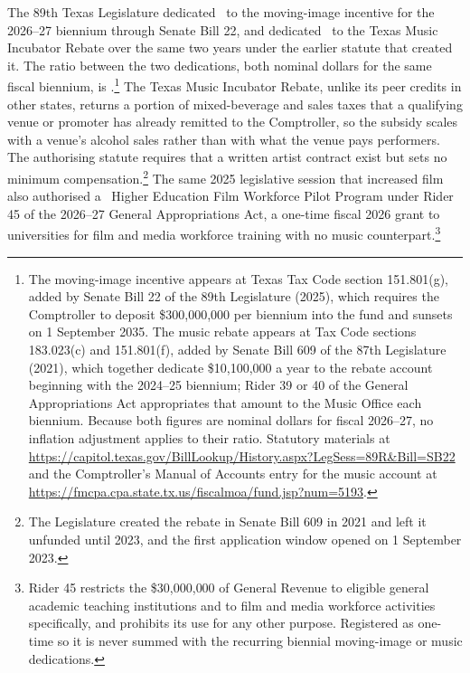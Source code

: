 The 89th Texas Legislature dedicated \NTxFilmIncentiveBiennium\ to the
moving-image incentive for the 2026--27 biennium through Senate Bill 22, and
dedicated \NTxMusicTmirBiennium\ to the Texas Music Incubator Rebate over the
same two years under the earlier statute that created it. The ratio between the
two dedications, both nominal dollars for the same fiscal biennium, is
\NTxFilmMusicRatio.\footnote{The moving-image incentive appears at Texas Tax
Code section 151.801(g), added by Senate Bill 22 of the 89th Legislature
(2025), which requires the Comptroller to deposit \$300{,}000{,}000 per
biennium into the fund and sunsets on 1 September 2035. The music rebate
appears at Tax Code sections 183.023(c) and 151.801(f), added by Senate Bill
609 of the 87th Legislature (2021), which together dedicate
\$10{,}100{,}000 a year to the rebate account beginning with the 2024--25
biennium; Rider 39 or 40 of the General Appropriations Act appropriates that
amount to the Music Office each biennium. Because both figures are nominal
dollars for fiscal 2026--27, no inflation adjustment applies to their ratio.
Statutory materials at
\url{https://capitol.texas.gov/BillLookup/History.aspx?LegSess=89R\&Bill=SB22}
and the Comptroller's Manual of Accounts entry for the music account at
\url{https://fmcpa.cpa.state.tx.us/fiscalmoa/fund.jsp?num=5193}.}
The Texas Music Incubator Rebate, unlike its peer credits in other states,
returns a portion of mixed-beverage and sales taxes that a qualifying venue or
promoter has already remitted to the Comptroller, so the subsidy scales with a
venue's alcohol sales rather than with what the venue pays performers. The
authorising statute requires that a written artist contract exist but sets no
minimum compensation.\footnote{The Legislature created the rebate in Senate
Bill 609 in 2021 and left it unfunded until 2023, and the first application
window opened on 1 September 2023.} The same 2025 legislative session that
increased film also authorised a \NTxFilmWorkforcePilotOnetime\ Higher
Education Film Workforce Pilot Program under Rider 45 of the 2026--27 General
Appropriations Act, a one-time fiscal 2026 grant to universities for film and
media workforce training with no music counterpart.\footnote{Rider 45 restricts
the \$30{,}000{,}000 of General Revenue to eligible general academic teaching
institutions and to film and media workforce activities specifically, and
prohibits its use for any other purpose. Registered as one-time so it is never
summed with the recurring biennial moving-image or music dedications.}

